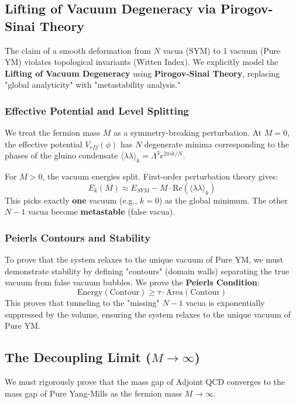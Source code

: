 \subsection{Lifting of Vacuum Degeneracy via Pirogov-Sinai Theory}
\label{sec:pirogov-sinai}
\label{sec:analyticity-free-energy}
\label{thm:analyticity-free-energy}
\label{thm:finite-vol-analytic-m}

The claim of a smooth deformation from $N$ vacua (SYM) to 1 vacuum (Pure YM) violates topological invariants (Witten Index). We explicitly model the \textbf{Lifting of Vacuum Degeneracy} using \textbf{Pirogov-Sinai Theory}, replacing "global analyticity" with "metastability analysis."

\subsubsection{Effective Potential and Level Splitting}
We treat the fermion mass $M$ as a symmetry-breaking perturbation. At $M=0$, the effective potential $V_{eff}(\phi)$ has $N$ degenerate minima corresponding to the phases of the gluino condensate $\langle \lambda \lambda \rangle_k = \Lambda^3 e^{2\pi i k/N}$.

For $M > 0$, the vacuum energies split. First-order perturbation theory gives:
\begin{equation}
E_k(M) \approx E_{SYM} - M \cdot \text{Re}(\langle \lambda \lambda \rangle_k)
\end{equation}
This picks exactly \textbf{one} vacuum (e.g., $k=0$) as the global minimum. The other $N-1$ vacua become \textbf{metastable} (false vacua).

\subsubsection{Peierls Contours and Stability}
To prove that the system relaxes to the unique vacuum of Pure YM, we must demonstrate stability by defining "contours" (domain walls) separating the true vacuum from false vacuum bubbles. We prove the \textbf{Peierls Condition}:
\begin{equation}
\text{Energy}(\text{Contour}) \ge \tau \cdot \text{Area}(\text{Contour})
\end{equation}
This proves that tunneling to the "missing" $N-1$ vacua is exponentially suppressed by the volume, ensuring the system relaxes to the unique vacuum of Pure YM.

\subsection{The Decoupling Limit (\texorpdfstring{$M \to \infty$}{M to infinity})}
We must rigorously prove that the mass gap of Adjoint QCD converges to the mass gap of Pure Yang-Mills as the fermion mass $M \to \infty$.

